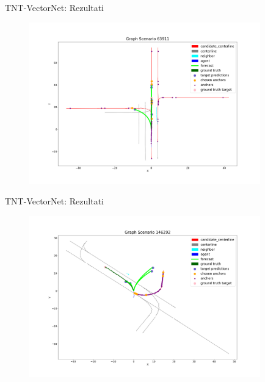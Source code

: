 \documentclass[bookmarks=true,bookmarksopen=true,pdfborder={0 0 0},pdfhighlight={/N},linkbordercolor={.5 .5 .5},implicit=false,unicode,xcolor={table}]{beamer}
\begin{document}
\begin{frame}{TNT-VectorNet: Rezultati}
  \begin{figure}
		\includegraphics[width=10cm,height=7cm]{result_MIA_63911.png}
	\end{figure}
  
\end{frame}

\begin{frame}{TNT-VectorNet: Rezultati}
  \begin{figure}
		\includegraphics[width=10cm,height=7cm]{result_PIT_146292.png}
	\end{figure}
  
\end{frame}
\end{document}
